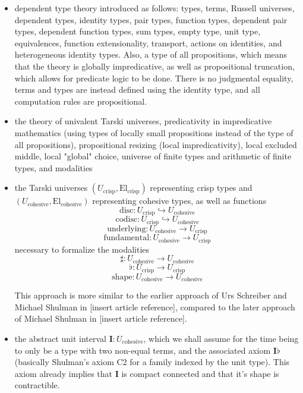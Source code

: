 \documentclass[one]{article}
\begin{document}
\begin{itemize}
\item dependent type theory introduced as follows: types, terms, Russell universes, dependent types, identity types, pair types, function types, dependent pair types, dependent function types, sum types, empty type, unit type, equivalences, function extensionality, transport, actions on identities, and heterogeneous identity types. Also, a type of all propositions, which means that the theory is globally impredicative, as well as propositional truncation, which allows for predicate logic to be done. There is no judgmental equality, terms and types are instead defined using the identity type, and all computation rules are propositional. 

\item the theory of univalent Tarski universes, predicativity in impredicative mathematics (using types of locally small propositions instead of the type of all propositions), propositional resizing (local impredicativity), local excluded middle, local "global" choice, universe of finite types and arithmetic of finite types, and modalities

\item the Tarski universes $(U_\mathrm{crisp}, \mathrm{El}_\mathrm{crisp})$ representing crisp types and $(U_\mathrm{cohesive}, \mathrm{El}_\mathrm{cohesive})$ representing cohesive types, as well as functions 
$$\mathrm{disc}:U_\mathrm{crisp} \hookrightarrow U_\mathrm{cohesive}$$ 
$$\mathrm{codisc}:U_\mathrm{crisp} \hookrightarrow U_\mathrm{cohesive}$$
$$\mathrm{underlying}:U_\mathrm{cohesive} \to U_\mathrm{crisp}$$ 
$$\mathrm{fundamental}:U_\mathrm{cohesive} \to U_\mathrm{crisp}$$ 
necessary to formalize the modalities 
$$\sharp:U_\mathrm{cohesive} \to U_\mathrm{cohesive}$$
$$\flat:U_\mathrm{crisp} \to U_\mathrm{crisp}$$
$$\mathrm{shape}:U_\mathrm{cohesive} \to U_\mathrm{cohesive}$$

This approach is more similar to the earlier approach of Urs Schreiber and Michael Shulman in [insert article reference], compared to the later approach of Michael Shulman in [insert article reference]. 

\item the abstract unit interval $\mathbf{I}:U_\mathrm{cohesive}$, which we shall assume for the time being to only be a type with two non-equal terms, and the associated axiom $\mathbf{I} \flat$ (basically Shulman's axiom C2 for a family indexed by the unit type). This axiom already implies that $\mathbf{I}$ is compact connected and that it's shape is contractible. 

\end{itemize}
\end{document}
